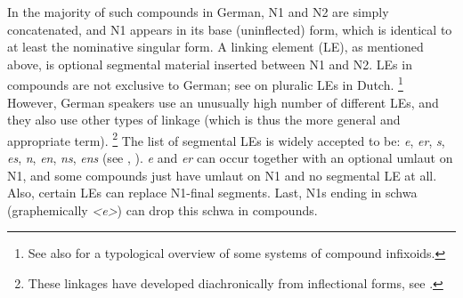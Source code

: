 In the majority of such compounds in German, N1 and N2 are simply concatenated, and N1 appears in its base (uninflected) form, which is identical to at least the nominative singular form.
A linking element (LE), as mentioned above, is optional segmental material inserted between N1 and N2.
LEs in compounds are not exclusive to German; see \textcite{SchreuderEa1998,BangaEa2013a,BangaEa2013b} on pluralic LEs in Dutch.%
\footnote{See also \textcite[27]{KrottEa2007} for a typological overview of some systems of compound infixoids.
}
However, German speakers use an unusually high number of different LEs, and they also use other types of linkage (which is thus the more general and appropriate term).%
\footnote{These linkages have developed diachronically from inflectional forms, see \textcite{NueblingSzczepaniak2013,Szczepaniak2016}.}
The list of segmental LEs is widely accepted to be: \textit{e}, \textit{er}, \textit{s}, \textit{es}, \textit{n}, \textit{en}, \textit{ns}, \textit{ens} (see \citealt[31]{Neef2015}, \citealt{KrottEa2007}).
\textit{e} and \textit{er} can occur together with an optional umlaut on N1, and some compounds just have umlaut on N1 and no segmental LE at all.
Also, certain LEs can replace N1-final segments.
Last, N1s ending in schwa (graphemically \textit{<e>}) can drop this schwa in compounds.

